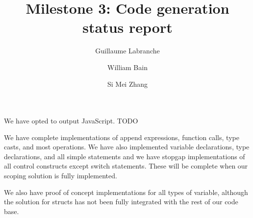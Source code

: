 \documentclass[oneside]{article}
\begin{document}
\title{Milestone 3: Code generation status report}
\author{Guillaume Labranche \and William Bain \and Si Mei Zhang}
\maketitle

We have opted to output JavaScript. TODO

We have complete implementations of append expressions, function calls, type casts, and most operations. We have also implemented variable declarations, type declarations, and all simple statements and we have stopgap implementations of all control constructs except switch statements. These will be complete when our scoping solution is fully implemented.

We also have proof of concept implementations for all types of variable, although the solution for structs has not been fully integrated with the rest of our code base.
\end{document}
